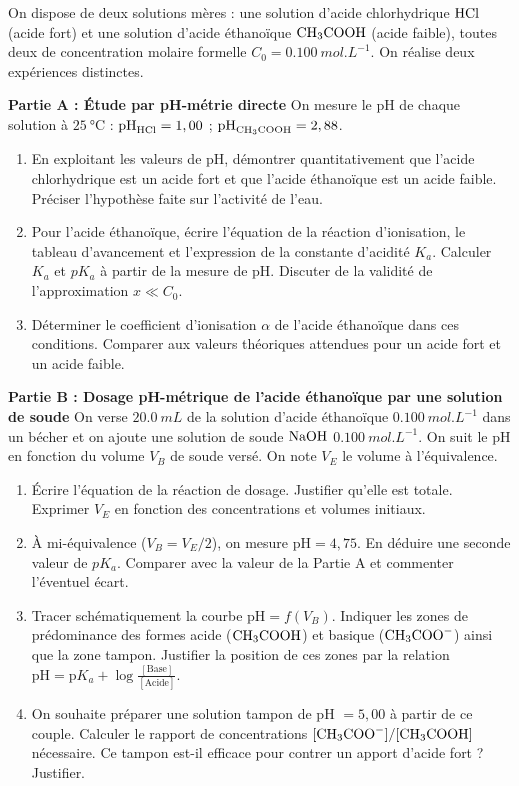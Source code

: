\documentclass[11pt]{article}
\begin{document}
\begin{exercice}
On dispose de deux solutions mères : une solution d'acide chlorhydrique $\ce{HCl}$ (acide fort) et une solution d'acide éthanoïque $\ce{CH3COOH}$ (acide faible), toutes deux de concentration molaire formelle $C_0 = \SI{0.100}{mol.L^{-1}}$. On réalise deux expériences distinctes.

\textbf{Partie A : Étude par pH-métrie directe}
On mesure le pH de chaque solution à $\SI{25}{\celsius}$ : $\text{pH}_{\ce{HCl}} = 1,00$ ; $\text{pH}_{\ce{CH3COOH}} = 2,88$.

\begin{enumerate}
    \item En exploitant les valeurs de pH, démontrer quantitativement que l'acide chlorhydrique est un acide fort et que l'acide éthanoïque est un acide faible. Préciser l'hypothèse faite sur l'activité de l'eau.
    \item Pour l'acide éthanoïque, écrire l'équation de la réaction d'ionisation, le tableau d'avancement et l'expression de la constante d'acidité $K_a$. Calculer $K_a$ et $pK_a$ à partir de la mesure de pH. Discuter de la validité de l'approximation $x \ll C_0$.
    \item Déterminer le coefficient d'ionisation $\alpha$ de l'acide éthanoïque dans ces conditions. Comparer aux valeurs théoriques attendues pour un acide fort et un acide faible.
\end{enumerate}

\textbf{Partie B : Dosage pH-métrique de l'acide éthanoïque par une solution de soude}
On verse $\SI{20.0}{mL}$ de la solution d'acide éthanoïque $\SI{0.100}{mol.L^{-1}}$ dans un bécher et on ajoute une solution de soude $\ce{NaOH}$ $\SI{0.100}{mol.L^{-1}}$. On suit le pH en fonction du volume $V_B$ de soude versé. On note $V_{E}$ le volume à l'équivalence.

\begin{enumerate}[resume]
    \item Écrire l'équation de la réaction de dosage. Justifier qu'elle est totale. Exprimer $V_E$ en fonction des concentrations et volumes initiaux.
    \item À mi-équivalence ($V_B = V_E/2$), on mesure $\text{pH} = 4,75$. En déduire une seconde valeur de $pK_a$. Comparer avec la valeur de la Partie A et commenter l'éventuel écart.
    \item Tracer schématiquement la courbe $\text{pH} = f(V_B)$. Indiquer les zones de prédominance des formes acide ($\ce{CH3COOH}$) et basique ($\ce{CH3COO-}$) ainsi que la zone tampon. Justifier la position de ces zones par la relation $\text{pH} = \text{p}K_a + \log\frac{[\text{Base}]}{[\text{Acide}]}$.
    \item On souhaite préparer une solution tampon de pH $= 5,00$ à partir de ce couple. Calculer le rapport de concentrations $[\ce{CH3COO-}]/[\ce{CH3COOH}]$ nécessaire. Ce tampon est-il efficace pour contrer un apport d'acide fort ? Justifier.
\end{enumerate}
\end{exercice}
\end{document}

